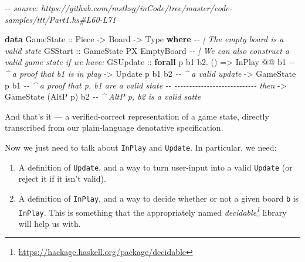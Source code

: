 \documentclass[]{article}
\newenvironment{Shaded}{}{}
\newcommand{\CommentTok}[1]{\textcolor[rgb]{0.38,0.63,0.69}{\textit{#1}}}
\newcommand{\DataTypeTok}[1]{\textcolor[rgb]{0.56,0.13,0.00}{#1}}
\newcommand{\KeywordTok}[1]{\textcolor[rgb]{0.00,0.44,0.13}{\textbf{#1}}}
\newcommand{\NormalTok}[1]{#1}
\newcommand{\OperatorTok}[1]{\textcolor[rgb]{0.40,0.40,0.40}{#1}}
\newcommand{\OtherTok}[1]{\textcolor[rgb]{0.00,0.44,0.13}{#1}}
\renewcommand{\href}[2]{#2\footnote{\url{#1}}}
\begin{document}
\begin{Shaded}
\begin{Highlighting}[]
\CommentTok{{-}{-} source: https://github.com/mstksg/inCode/tree/master/code{-}samples/ttt/Part1.hs\#L60{-}L71}

\KeywordTok{data} \DataTypeTok{GameState}\OtherTok{ ::} \DataTypeTok{Piece} \OtherTok{{-}\textgreater{}} \DataTypeTok{Board} \OtherTok{{-}\textgreater{}} \DataTypeTok{Type} \KeywordTok{where}
    \CommentTok{{-}{-} | The empty board is a valid state}
    \DataTypeTok{GSStart}
\OtherTok{        ::} \DataTypeTok{GameState} \DataTypeTok{\textquotesingle{}PX} \DataTypeTok{EmptyBoard}
    \CommentTok{{-}{-} | We can also construct a valid game state if we have:}
    \DataTypeTok{GSUpdate}
\OtherTok{        ::} \KeywordTok{forall}\NormalTok{ p b1 b2}\OperatorTok{.}\NormalTok{ ()}
        \OtherTok{=\textgreater{}} \DataTypeTok{InPlay}          \OperatorTok{@@}\NormalTok{ b1     }\CommentTok{{-}{-} \^{} a proof that b1 is in play}
        \OtherTok{{-}\textgreater{}} \DataTypeTok{Update}\NormalTok{    p        b1 b2  }\CommentTok{{-}{-} \^{} a valid update}
        \OtherTok{{-}\textgreater{}} \DataTypeTok{GameState}\NormalTok{ p        b1     }\CommentTok{{-}{-} \^{} a proof that p, b1 are a valid state}
        \CommentTok{{-}{-} {-}{-}{-}{-}{-}{-}{-}{-}{-}{-}{-}{-}{-}{-}{-}{-}{-}{-}{-}{-}{-}{-}{-}{-}{-}{-}{-}{-} then}
        \OtherTok{{-}\textgreater{}} \DataTypeTok{GameState}\NormalTok{ (}\DataTypeTok{AltP}\NormalTok{ p)    b2  }\CommentTok{{-}{-} \^{} \textasciigrave{}AltP p\textasciigrave{}, b2 is a valid satte}
\end{Highlighting}
\end{Shaded}

And that's it --- a verified-correct representation of a game state, directly
transcribed from our plain-language denotative specification.

Now we just need to talk about \texttt{InPlay} and \texttt{Update}. In
particular, we need:

\begin{enumerate}
\def\labelenumi{\arabic{enumi}.}
\tightlist
\item
  A definition of \texttt{Update}, and a way to turn user-input into a valid
  \texttt{Update} (or reject it if it isn't valid).
\item
  A definition of \texttt{InPlay}, and a way to decide whether or not a given
  board \texttt{b} is \texttt{InPlay}. This is something that the appropriately
  named \emph{\href{https://hackage.haskell.org/package/decidable}{decidable}}
  library will help us with.
\end{enumerate}
\end{document}
